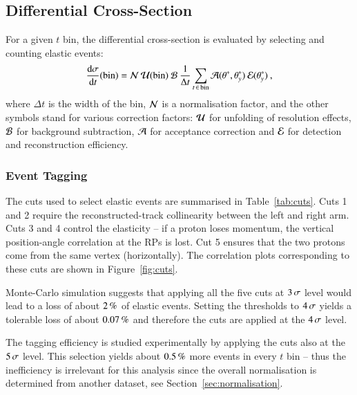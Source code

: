 
\subsection{Differential Cross-Section}
\label{sec:diff cs}

For a given $t$ bin, the differential cross-section is evaluated by selecting and counting elastic events:
\begin{equation}
	{{\rm d}\sigma\over {\rm d}t}(\hbox{bin}) =
		{\cal N}\: {\cal U}({\rm bin})\: {\cal B} \: 
		\frac{1}{\Delta t}
                \sum\limits_{t\, \in\, \text{bin}} {\cal A}(\theta^*, \theta_y^*)\: {\cal E}(\theta_y^*) \: ,
\end{equation}
where $\Delta t$ is the width of the bin, ${\cal N}$ is a normalisation factor, 
and the other symbols stand for various correction factors:
${\cal U}$ for unfolding of resolution effects, ${\cal B}$ for background subtraction, ${\cal A}$ for acceptance correction and ${\cal E}$ for detection and reconstruction efficiency.


\subsubsection{Event Tagging}
\label{sec:tagging}

The cuts used to select elastic events are summarised in Table~\ref{tab:cuts}. Cuts 1 and 2 require the reconstructed-track collinearity between the left and right arm. Cuts 3 and 4 control the elasticity -- if a proton loses momentum, the vertical position-angle correlation at the RPs is lost. Cut 5 ensures that the two protons come from the same vertex (horizontally). The correlation plots corresponding to these cuts are shown in Figure~\ref{fig:cuts}.

Monte-Carlo simulation suggests that applying all the five cuts at $3\,{\rm \sigma}$ level would lead to a loss of about $2\,{\rm \%}$ of elastic events. Setting the thresholds to $4\,{\rm \sigma}$ yields a tolerable loss of about $0.07\,{\rm \%}$ and therefore the cuts are applied at the $4\,{\rm \sigma}$ level.

The tagging efficiency is studied experimentally by applying the cuts also at the $5\,{\rm \sigma}$ level. This selection yields about $0.5\,{\rm \%}$ more events in every $t$ bin -- thus the inefficiency is irrelevant for this analysis since the overall normalisation is determined from another dataset, see Section~\ref{sec:normalisation}.


